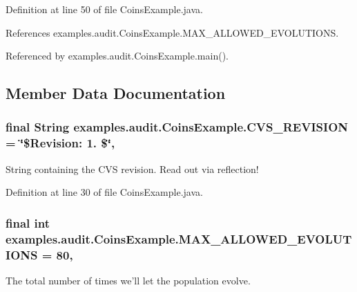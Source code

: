 Definition at line 50 of file Coins\-Example.\-java.



References examples.\-audit.\-Coins\-Example.\-M\-A\-X\-\_\-\-A\-L\-L\-O\-W\-E\-D\-\_\-\-E\-V\-O\-L\-U\-T\-I\-O\-N\-S.



Referenced by examples.\-audit.\-Coins\-Example.\-main().



\subsection{Member Data Documentation}
\hypertarget{classexamples_1_1audit_1_1_coins_example_aa8c485cb7545c44bcea25462778a9a7f}{
\subsubsection[{C\-V\-S\-\_\-\-R\-E\-V\-I\-S\-I\-O\-N}]{\setlength{\rightskip}{0pt plus 5cm}final String examples.\-audit.\-Coins\-Example.\-C\-V\-S\-\_\-\-R\-E\-V\-I\-S\-I\-O\-N = \char`\"{}\$Revision\-: 1. \$\char`\"{}\hspace{0.3cm}{\ttfamily [static]}, {\ttfamily [private]}}}\label{classexamples_1_1audit_1_1_coins_example_aa8c485cb7545c44bcea25462778a9a7f}
String containing the C\-V\-S revision. Read out via reflection! 

Definition at line 30 of file Coins\-Example.\-java.

\hypertarget{classexamples_1_1audit_1_1_coins_example_a2dc1f51908580ca9a6f693a7cfb99b10}{
\subsubsection[{M\-A\-X\-\_\-\-A\-L\-L\-O\-W\-E\-D\-\_\-\-E\-V\-O\-L\-U\-T\-I\-O\-N\-S}]{\setlength{\rightskip}{0pt plus 5cm}final int examples.\-audit.\-Coins\-Example.\-M\-A\-X\-\_\-\-A\-L\-L\-O\-W\-E\-D\-\_\-\-E\-V\-O\-L\-U\-T\-I\-O\-N\-S = 80\hspace{0.3cm}{\ttfamily [static]}, {\ttfamily [private]}}}\label{classexamples_1_1audit_1_1_coins_example_a2dc1f51908580ca9a6f693a7cfb99b10}
The total number of times we'll let the population evolve. 


